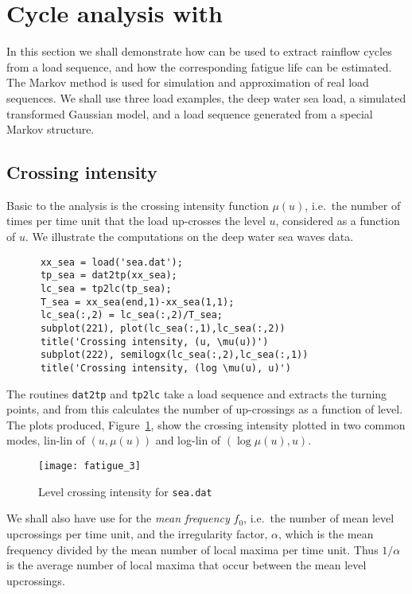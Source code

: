 \section{Cycle analysis with \progname}
\label{sec:cycleanalysiswithWAFO}

In this section we shall demonstrate how \progname{} can be used to extract
rainflow cycles from a load sequence, and how the corresponding
fatigue life can be estimated.
The Markov method is used for simulation and approximation of real
load sequences. We shall use three load examples, the deep water sea
load, a simulated transformed Gaussian model, and a load sequence
generated from a special Markov structure.

\subsection{Crossing intensity}
\label{sec:crossingintensity}
Basic to the analysis is the crossing intensity function $\mu(u)$, i.e.\
the number of times per time unit that the load up-crosses the level $u$,
considered as a function of $u$.
We illustrate the computations on the deep water sea waves data.
{\small\begin{verbatim}
      xx_sea = load('sea.dat');
      tp_sea = dat2tp(xx_sea);
      lc_sea = tp2lc(tp_sea);
      T_sea = xx_sea(end,1)-xx_sea(1,1);
      lc_sea(:,2) = lc_sea(:,2)/T_sea;
      subplot(221), plot(lc_sea(:,1),lc_sea(:,2))
      title('Crossing intensity, (u, \mu(u))')
      subplot(222), semilogx(lc_sea(:,2),lc_sea(:,1))
      title('Crossing intensity, (log \mu(u), u)')
\end{verbatim}}
\noindent
The routines {\tt dat2tp}
and {\tt tp2lc} take a load sequence and extracts
the turning points, and from this calculates the number of up-crossings
as a function of level. The plots produced, Figure~\ref{fig_wafo_6.12}, show
the crossing intensity plotted in two common modes, lin-lin of $(u, \mu(u))$
and log-lin of $(\log \mu (u), u)$.
\begin{figure}
\centering
\texttt{[image: fatigue\_3]}
\vspace{-3mm}
\caption{Level crossing intensity for {\tt sea.dat}}
\label{fig_wafo_6.12}
\end{figure}

We shall also have use for the {\it mean frequency} $f_0$, i.e.\ the number of
mean level upcrossings per time unit, and the irregularity factor, $\alpha$,
which is the mean frequency divided by the mean number of local maxima per
time unit. Thus $1/\alpha$ is the average number of local maxima that occur
between the mean level upcrossings. \index[xentr]{mean frequency}
\index[xentr]{irreularity factor}

